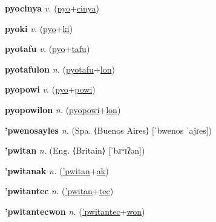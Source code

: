 \textbf{\hypertarget{pyocinya}{pyocinya}} \textit{v.} (\hyperlink{pyo}{pyo}+\allowbreak \hyperlink{cinya}{cinya})


\textbf{\hypertarget{pyoki}{pyoki}} \textit{v.} (\hyperlink{pyo}{pyo}+\allowbreak \hyperlink{ki}{ki})


\textbf{\hypertarget{pyotafu}{pyotafu}} \textit{v.} (\hyperlink{pyo}{pyo}+\allowbreak \hyperlink{tafu}{tafu})


\textbf{\hypertarget{pyotafulon}{pyotafulon}} \textit{n.} (\hyperlink{pyotafu}{pyotafu}+\allowbreak \hyperlink{lon}{lon})


\textbf{\hypertarget{pyopowi}{pyopowi}} \textit{v.} (\hyperlink{pyo}{pyo}+\allowbreak \hyperlink{powi}{powi})


\textbf{\hypertarget{pyopowilon}{pyopowilon}} \textit{n.} (\hyperlink{pyopowi}{pyopowi}+\allowbreak \hyperlink{lon}{lon})


\textbf{\hypertarget{'pwenosayles}{'pwenosayles}} \textit{n.} (Spa. ⟨Buenos Aires⟩ [ˈbwenos ˈajɾes])


\textbf{\hypertarget{'pwitan}{'pwitan}} \textit{n.} (Eng. ⟨Britain⟩ [ˈbɹʷɪʔən])


\textbf{\hypertarget{'pwitanak}{'pwitanak}} \textit{n.} (\hyperlink{'pwitan}{'pwitan}+\allowbreak \hyperlink{ak}{ak})


\textbf{\hypertarget{'pwitantec}{'pwitantec}} \textit{n.} (\hyperlink{'pwitan}{'pwitan}+\allowbreak \hyperlink{tec}{tec})


\textbf{\hypertarget{'pwitantecwon}{'pwitantecwon}} \textit{n.} (\hyperlink{'pwitantec}{'pwitantec}+\allowbreak \hyperlink{won}{won})


